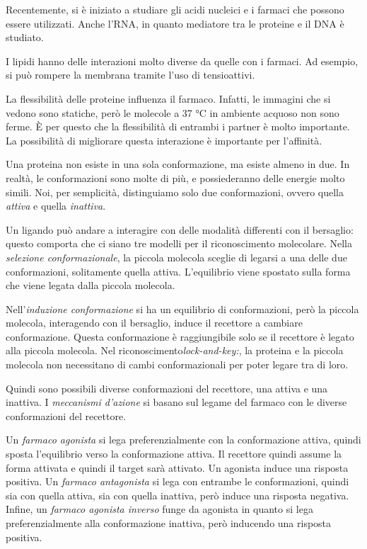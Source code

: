 Recentemente, si è iniziato a studiare gli acidi nucleici e i farmaci
che possono essere utilizzati. Anche l'RNA, in quanto mediatore tra le
proteine e il DNA è studiato.

I lipidi hanno delle interazioni molto diverse da quelle con i farmaci.
Ad esempio, si può rompere la membrana tramite l'uso di tensioattivi.

La flessibilità delle proteine influenza il farmaco. Infatti, le
immagini che si vedono sono statiche, però le molecole a 37 °C in
ambiente acquoso non sono ferme. È per questo che la flessibilità di
entrambi i partner è molto importante. La possibilità di migliorare
questa interazione è importante per l'affinità.

Una proteina non esiste in una sola conformazione, ma esiste almeno in
due. In realtà, le conformazioni sono molte di più, e possiederanno
delle energie molto simili. Noi, per semplicità, distinguiamo solo due
conformazioni, ovvero quella \emph{attiva} e quella \emph{inattiva}.

Un ligando può andare a interagire con delle modalità differenti con il
bersaglio: questo comporta che ci siano tre modelli per il
riconoscimento molecolare. Nella \emph{selezione conformazionale}, la
piccola molecola sceglie di legarsi a una delle due conformazioni,
solitamente quella attiva. L'equilibrio viene spostato sulla forma che
viene legata dalla piccola molecola.


Nell'\emph{induzione conformazione} si ha un equilibrio di
conformazioni, però la piccola molecola, interagendo con il bersaglio,
induce il recettore a cambiare conformazione. Questa conformazione è
raggiungibile solo se il recettore è legato alla piccola molecola.
Nel riconoscimento\emph{lock-and-key:}, la proteina e la piccola
molecola non necessitano di cambi conformazionali per poter legare tra
di loro.

Quindi sono possibili diverse conformazioni del recettore, una attiva e
una inattiva. I \emph{meccanismi d'azione} si basano sul legame del
farmaco con le diverse conformazioni del recettore.

Un \emph{farmaco agonista} si lega preferenzialmente con la
conformazione attiva, quindi sposta l'equilibrio verso la conformazione
attiva. Il recettore quindi assume la forma attivata e quindi il target
sarà attivato. Un agonista induce una risposta positiva.
Un \emph{farmaco antagonista} si lega con entrambe le conformazioni,
quindi sia con quella attiva, sia con quella inattiva, però induce una
risposta negativa.
Infine, un \emph{farmaco agonista inverso} funge da agonista in quanto
si lega preferenzialmente alla conformazione inattiva, però inducendo
una risposta positiva.

